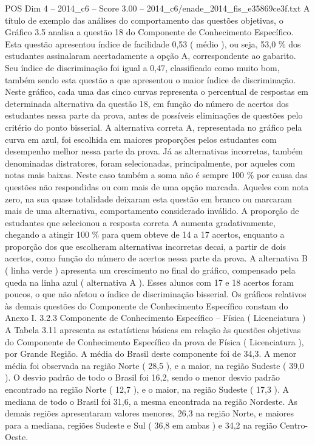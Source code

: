 \begin{textsample}{POS Dim 4 – 2014\_c6 – Score 3.00 – 2014\_c6/enade\_2014\_fis\_e35869ce3f.txt}
A título de exemplo das análises do comportamento das questões objetivas, o Gráfico 3.5 analisa a questão 18 do Componente de Conhecimento Específico.
Esta questão apresentou índice de facilidade 0,53 ( médio ), ou seja, 53,0 \% dos estudantes assinalaram acertadamente a opção A, correspondente ao gabarito.
Seu índice de discriminação foi igual a 0,47, classificado como muito bom, também sendo esta questão a que apresentou o maior índice de discriminação.
Neste gráfico, cada uma das cinco curvas representa o percentual de respostas em determinada alternativa da questão 18, em função do número de acertos dos estudantes nessa parte da prova, antes de possíveis eliminações de questões pelo critério do ponto bisserial.
A alternativa correta A, representada no gráfico pela curva em azul, foi escolhida em maiores proporções pelos estudantes com desempenho melhor nessa parte da prova.
Já as alternativas incorretas, também denominadas distratores, foram selecionadas, principalmente, por aqueles com notas mais baixas.
Neste caso também a soma não é sempre 100 \% por causa das questões não respondidas ou com mais de uma opção marcada.
Aqueles com nota zero, na sua quase totalidade deixaram esta questão em branco ou marcaram mais de uma alternativa, comportamento considerado inválido.
A proporção de estudantes que selecionou a resposta correta A aumenta gradativamente, chegando a atingir 100 \% para quem obteve de 14 a 17 acertos, enquanto a proporção dos que escolheram alternativas incorretas decai, a partir de dois acertos, como função do número de acertos nessa parte da prova.
A alternativa B ( linha verde ) apresenta um crescimento no final do gráfico, compensado pela queda na linha azul ( alternativa A ).
Esses alunos com 17 e 18 acertos foram poucos, o que não afetou o índice de discriminação bisserial.
Os gráficos relativos às demais questões do Componente de Conhecimento Específico constam do Anexo I. 3.2.3 Componente de Conhecimento Específico – Física ( Licenciatura ) A Tabela 3.11 apresenta as estatísticas básicas em relação às questões objetivas do Componente de Conhecimento Específico da prova de Física ( Licenciatura ), por Grande Região.
A média do Brasil deste componente foi de 34,3.
A menor média foi observada na região Norte ( 28,5 ), e a maior, na região Sudeste ( 39,0 ).
O desvio padrão de todo o Brasil foi 16,2, sendo o menor desvio padrão encontrado na região Norte ( 12,7 ), e o maior, na região Sudeste ( 17,3 ).
A mediana de todo o Brasil foi 31,6, a mesma encontrada na região Nordeste.
As demais regiões apresentaram valores menores, 26,3 na região Norte, e maiores para a mediana, regiões Sudeste e Sul ( 36,8 em ambas ) e 34,2 na região Centro-Oeste.

\end{textsample}
